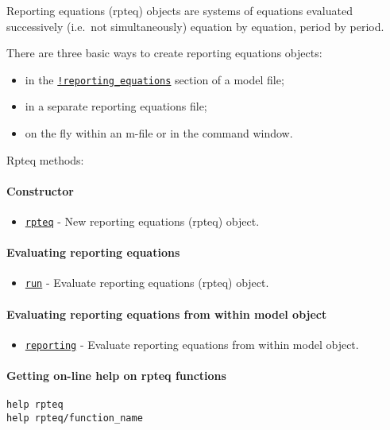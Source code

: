 

	Reporting equations (rpteq) objects are systems of equations evaluated
successively (i.e.~not simultaneously) equation by equation, period by
period.

There are three basic ways to create reporting equations objects:

\begin{itemize}
\item
  in the
  \href{modellang/reportingequations}{\texttt{!reporting\_equations}}
  section of a model file;
\item
  in a separate reporting equations file;
\item
  on the fly within an m-file or in the command window.
\end{itemize}

Rpteq methods:

\paragraph{Constructor}

\begin{itemize}
\itemsep1pt\parskip0pt
\item
  \href{rpteq/rpteq}{\texttt{rpteq}} - New reporting equations (rpteq)
  object.
\end{itemize}

\paragraph{Evaluating reporting
equations}

\begin{itemize}
\itemsep1pt\parskip0pt
\item
  \href{rpteq/run}{\texttt{run}} - Evaluate reporting equations (rpteq)
  object.
\end{itemize}

\paragraph{Evaluating reporting equations from within model
object}

\begin{itemize}
\itemsep1pt\parskip0pt
\item
  \href{model/reporting}{\texttt{reporting}} - Evaluate reporting
  equations from within model object.
\end{itemize}

\paragraph{Getting on-line help on rpteq
functions}

\begin{verbatim}
help rpteq
help rpteq/function_name
\end{verbatim}



